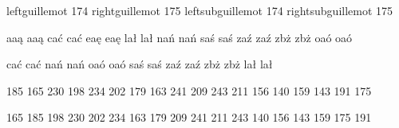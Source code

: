 \startencoding[pl0]

 leftguillemot      174  %
 rightguillemot     175  %
 leftsubguillemot   174  %
 rightsubguillemot  175  %

\stopencoding

\startencoding[pl0]

 {a}{a}{\k a}    {a}{a}{\k a}
 {c}{a}{\'c}     {c}{a}{\'c}
 {e}{a}{\k e}    {e}{a}{\k e}
 {l}{a}{\l }     {l}{a}{\l }
 {n}{a}{\'n}     {n}{a}{\'n}
 {s}{a}{\'s}     {s}{a}{\'s}
 {z}{a}{\'z}     {z}{a}{\'z}
 {z}{b}{\.z}     {z}{b}{\.z}
 {o}{a}{\'o}     {o}{a}{\'o}

 {c}{a}{\'c}     {c}{a}{\'c}
 {n}{a}{\'n}     {n}{a}{\'n}
 {o}{a}{\'o}     {o}{a}{\'o}
 {s}{a}{\'s}     {s}{a}{\'s}
 {z}{a}{\'z}     {z}{a}{\'z}
 {z}{b}{\.z}     {z}{b}{\.z}
   
   
 {l}{a}{\l}      {l}{a}{\l}

\stopencoding


\startmapping[pl1]

 185 165  %
 230 198  %
 234 202  %
 179 163  %
 241 209  %
 243 211  %
 156 140  %
 159 143  %
 191 175  %

 165 185  %
 198 230  %
 202 234  %
 163 179  %
 209 241  %
 211 243  %
 140 156  %
 143 159  %
 175 191  %

